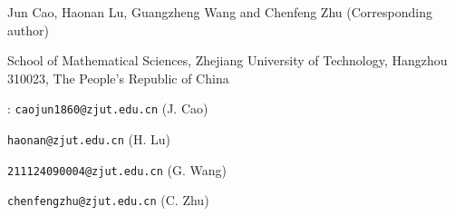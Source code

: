\documentclass[11pt,twoside]{article}
\theoremstyle{mylem}
\theoremstyle{definition}
\numberwithin{equation}{section}
\begin{document}
\bigskip

\noindent Jun Cao, Haonan Lu, Guangzheng Wang and Chenfeng Zhu (Corresponding author)

\medskip

\noindent  	School of Mathematical Sciences,
Zhejiang University of Technology, Hangzhou 310023,
The People's Republic of China

\smallskip

: \texttt{caojun1860@zjut.edu.cn} (J. Cao)

\noindent{} \texttt{haonan@zjut.edu.cn} (H. Lu)

\noindent{} \texttt{211124090004@zjut.edu.cn} (G. Wang)

\noindent{} \texttt{chenfengzhu@zjut.edu.cn} (C. Zhu)
\end{document}

